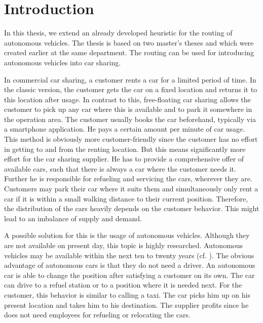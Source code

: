 \chapter{Introduction}
\label{ch:introduction}


In this thesis, we extend an already developed heuristic for the routing of autonomous vehicles. The thesis is based on two master's theses \cite{Kaiser} and \cite{Knoll} which were created earlier at the same department. The routing can be used for introducing autonomous vehicles into car sharing.

In commercial car sharing, a customer rents a car for a limited period of time. In the classic version, the customer gets the car on a fixed location and returns it to this location after usage. In contrast to this, free-floating car sharing allows the customer to pick up any car where this is available and to park it somewhere in the operation area. The customer usually books the car beforehand, typically via a smartphone application. He pays a certain amount per minute of car usage. This method is obviously more customer-friendly since the customer has no effort in getting to and from the renting location. But this means significantly more effort for the car sharing supplier. He has to provide a comprehensive offer of available cars, such that there is always a car where the customer needs it. Further he is responsible for refueling and servicing the cars, wherever they are. Customers may park their car where it suits them and simultaneously only rent a car if it is within a small walking distance to their current position. Therefore, the distribution of the cars heavily depends on the customer behavior. This might lead to an imbalance of supply and demand.

A possible solution for this is the usage of autonomous vehicles. Although they are not available on present day, this topic is highly researched. Autonomous vehicles may be available within the next ten to twenty years (cf. \cite{Hauser}). The obvious advantage of autonomous cars is that they do not need a driver. An autonomous car is able to change the position after satisfying a customer on its own. The car can drive to a refuel station or to a position where it is needed next. For the customer, this behavior is similar to calling a taxi. The car picks him up on his present location and takes him to his destination. The supplier profits since he does not need employees for refueling or relocating the cars.

